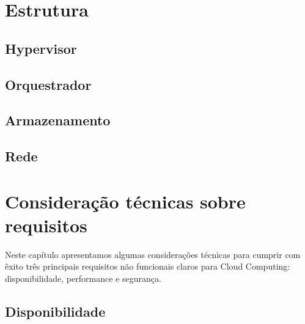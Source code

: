 \chapter{Estrutura}

\section{Hypervisor}
\section{Orquestrador}
\section{Armazenamento}
\section{Rede}

\chapter{Consideração técnicas sobre requisitos}
	Neste capítulo apresentamos algumas considerações técnicas para cumprir com êxito três principais requisitos não funcionais claros para Cloud Computing: disponibilidade, performance e segurança.

\section{Disponibilidade}

